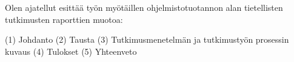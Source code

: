\documentclass[12pt,a4paper,finnish,oneside]{article}
\begin{document}
Olen ajatellut esittää työn myötäillen ohjelmistotuotannon alan tietellisten
tutkimusten raporttien muotoa:

(1) Johdanto
(2) Tausta
(3) Tutkimusmenetelmän ja tutkimustyön prosessin kuvaus
(4) Tulokset
(5) Yhteenveto


%


% 

\renewcommand{\refname}{Lähteet}  %



\end{document}
